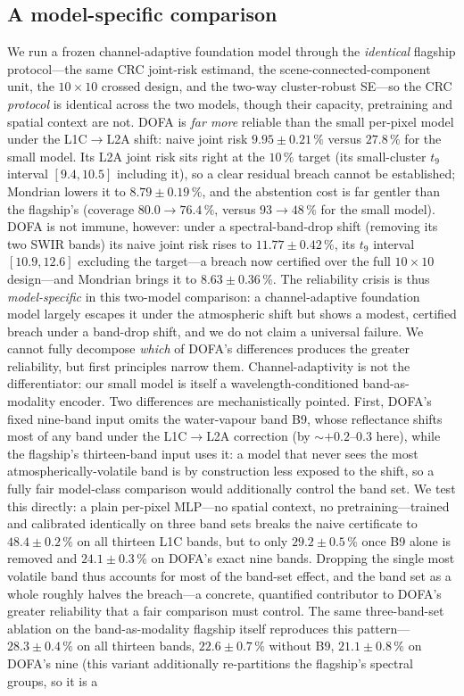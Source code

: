 \documentclass[preprint,3p,times]{elsarticle}
\begin{document}
\subsection{A model-specific comparison}
\label{sec:modelclass}
We run a frozen channel-adaptive foundation model \citep[DOFA,][]{xiong2024dofa} through the \emph{identical} flagship protocol---the same CRC joint-risk estimand, the scene-connected-component unit, the $10 \times 10$ crossed design, and the two-way cluster-robust SE---so the CRC \emph{protocol} is identical across the two models, though their capacity, pretraining and spatial context are not. DOFA is \emph{far more} reliable than the small per-pixel model under the L1C$\to$L2A shift: naive joint risk $9.95 \pm 0.21\,\%$ versus $27.8\,\%$ for the small model. Its L2A joint risk sits right at the $10\,\%$ target (its small-cluster $t_9$ interval $[9.4, 10.5]$ including it), so a clear residual breach cannot be established; Mondrian lowers it to $8.79 \pm 0.19\,\%$, and the abstention cost is far gentler than the flagship's (coverage $80.0 \to 76.4\,\%$, versus $93 \to 48\,\%$ for the small model). DOFA is not immune, however: under a spectral-band-drop shift (removing its two SWIR bands) its naive joint risk rises to $11.77 \pm 0.42\,\%$, its $t_9$ interval $[10.9, 12.6]$ excluding the target---a breach now certified over the full $10 \times 10$ design---and Mondrian brings it to $8.63 \pm 0.36\,\%$. The reliability crisis is thus \emph{model-specific} in this two-model comparison: a channel-adaptive foundation model largely escapes it under the atmospheric shift but shows a modest, certified breach under a band-drop shift, and we do not claim a universal failure. We cannot fully decompose \emph{which} of DOFA's differences produces the greater reliability, but first principles narrow them. Channel-adaptivity is not the differentiator: our small model is itself a wavelength-conditioned band-as-modality encoder. Two differences are mechanistically pointed. First, DOFA's fixed nine-band input omits the water-vapour band B9, whose reflectance shifts most of any band under the L1C$\to$L2A correction (by ${\sim}{+}0.2$--$0.3$ here), while the flagship's thirteen-band input uses it: a model that never sees the most atmospherically-volatile band is by construction less exposed to the shift, so a fully fair model-class comparison would additionally control the band set. We test this directly: a plain per-pixel MLP---no spatial context, no pretraining---trained and calibrated identically on three band sets breaks the naive certificate to $48.4 \pm 0.2\,\%$ on all thirteen L1C bands, but to only $29.2 \pm 0.5\,\%$ once B9 alone is removed and $24.1 \pm 0.3\,\%$ on DOFA's exact nine bands. Dropping the single most volatile band thus accounts for most of the band-set effect, and the band set as a whole roughly halves the breach---a concrete, quantified contributor to DOFA's greater reliability that a fair comparison must control. The same three-band-set ablation on the band-as-modality flagship itself reproduces this pattern---$28.3 \pm 0.4\,\%$ on all thirteen bands, $22.6 \pm 0.7\,\%$ without B9, $21.1 \pm 0.8\,\%$ on DOFA's nine (this variant additionally re-partitions the flagship's spectral groups, so it is a 
\end{document}
